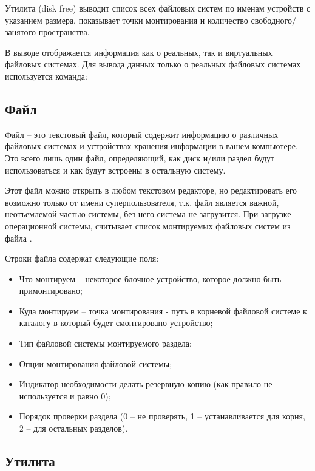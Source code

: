 Утилита  (disk free) выводит список всех файловых систем по именам устройств с указанием размера, показывает точки монтирования и количество свободного/занятого пространства.


В выводе отображается информация как о реальных, так и виртуальных файловых системах. Для вывода данных только о реальных файловых системах используется команда:


\subsection{Файл }

Файл  -- это текстовый файл, который содержит информацию о различных файловых системах и устройствах хранения информации в вашем компьютере. Это всего лишь один файл, определяющий, как диск и/или раздел будут использоваться и как будут встроены в остальную систему. 

Этот файл можно открыть в любом текстовом редакторе, но редактировать его возможно только от имени суперпользователя, т.к. файл является важной, неотъемлемой частью системы, без него система не загрузится. При загрузке операционной системы,  считывает список монтируемых файловых систем из файла .



Строки файла содержат следующие поля:
\begin{itemize}
	\item Что монтируем -- некоторое блочное устройство, которое должно быть примонтировано;
	\item Куда монтируем -- точка монтирования - путь в корневой файловой системе к каталогу в который будет смонтировано устройство;
	\item Тип файловой системы монтируемого раздела;
	\item Опции монтирования файловой системы;
	\item Индикатор необходимости делать резервную копию (как правило не используется и равно 0);
	\item Порядок проверки раздела (0 -- не проверять, 1 -- устанавливается для корня, 2 -- для остальных разделов).
\end{itemize}

\subsection{Утилита }

